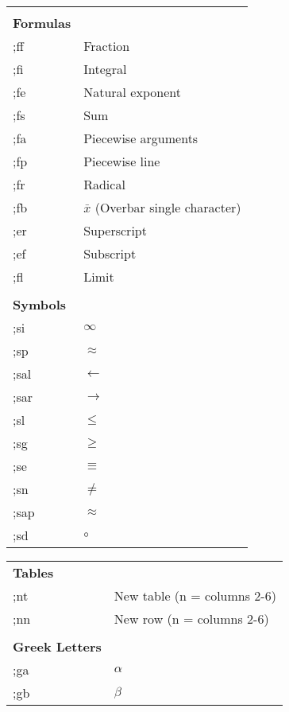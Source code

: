 \documentclass{article}
\begin{document}
\begin{figure}[H]
\begin{minipage}{0.48\textwidth}
\begin{table}[H]
\begin{tabular}{l l}
				&  \\
				\textbf{Formulas} 	&  \\
				;ff	& Fraction \\
				;fi	& Integral \\
				;fe	& Natural exponent \\
				;fs	& Sum \\
				;fa	& Piecewise arguments \\
				;fp	& Piecewise line \\
				;fr	& Radical \\
				;fb	& $\bar{x}$ (Overbar single character) \\
				;er	& Superscript\\
				;ef 	& Subscript\\
				;fl 	& Limit \\
				&  \\
				\textbf{Symbols} 	&  \\
				;si	& $\infty$  \\
				;sp	& $\approx$   \\
				;sal	& $\leftarrow $ \\
				;sar	& $\rightarrow $ \\
				;sl	& $\leq$  \\
				;sg	& $\geq $ \\
				;se	& $\equiv$ \\
				;sn	& $\neq$ \\
				;sap	& $\approx$ \\
				;sd	& $\circ$ \\
			\end{tabular}
		\end{table}
	\end{minipage}%
	\begin{minipage}{0.04\textwidth}
		\hfill
	\end{minipage}%
	\begin{minipage}{0.48\textwidth}
		\begin{table}[H]
			\centering
			\begin{tabular}{l l}
				\textbf{Tables} 	&  \\
				;nt	& New table (n = columns 2-6) \\
				;nn	& New row (n = columns 2-6) \\
				&  \\
				\textbf{Greek Letters} 	&  \\
				;ga   	& $\alpha  $  \\
				;gb	& $\beta $  \\

\end{tabular}
\end{table}
\end{minipage}
\end{figure}
\end{document}

